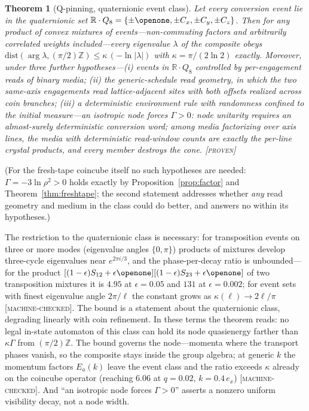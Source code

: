 \documentclass[aps,prd,twocolumn,superscriptaddress,nofootinbib,floatfix]{revtex4-2}
\newtheorem{theorem}{Theorem}
\newcommand{\evP}{\textnormal{\textsc{[proven]}}}
\newcommand{\evM}{\textnormal{\textsc{[machine-checked]}}}
\begin{document}
\begin{theorem}[Q-pinning, quaternionic event class]\label{thm:qbound}
Let every conversion event lie in the quaternionic set
$\mathbb R\cdot Q_8=\{\pm\openone,\pm C_x,\pm C_y,\pm C_z\}$. Then for
any product of convex mixtures of events---non-commuting factors and
arbitrarily correlated weights included---every eigenvalue $\lambda$ of
the composite obeys
$\mathrm{dist}(\arg\lambda,(\pi/2)\mathbb Z)\le\kappa\,(-\ln|\lambda|)$
with $\kappa=\pi/(2\ln2)$ exactly. Moreover, under three further
hypotheses---(i) events in $\mathbb R\cdot Q_8$ controlled by
per-engagement reads of binary media; (ii) the generic-schedule read
geometry, in which the two same-axis engagements read lattice-adjacent
sites with both offsets realized across coin branches; (iii) a
deterministic
environment rule with randomness confined to the initial measure---an
isotropic node forces $\Gamma>0$: node unitarity requires an
almost-surely deterministic conversion word; among media factorizing
over axis lines, the media with deterministic read-window counts are
exactly the per-line crystal products, and every member destroys the
cone. \evP{}
\end{theorem}

(For the fresh-tape coincube itself no such hypotheses are needed:
$\Gamma=-3\ln\rho^2>0$ holds exactly by Proposition~\ref{prop:factor}
and Theorem~\ref{thm:freshtape}; the second statement addresses whether
\emph{any} read geometry and medium in the class could do better, and
answers no within its hypotheses.)

The restriction to the quaternionic class is necessary: for
transposition events on three or more modes (eigenvalue angles
$\{0,\pi\}$) products of mixtures develop three-cycle eigenvalues near
$e^{2\pi i/3}$, and the phase-per-decay ratio is unbounded---for the
product $[(1-\epsilon)S_{12}+\epsilon\openone]
[(1-\epsilon)S_{23}+\epsilon\openone]$ of two transposition mixtures it
is $4.95$ at $\epsilon=0.05$ and $131$ at $\epsilon=0.002$; for event
sets with finest eigenvalue angle $2\pi/\ell$ the constant grows as
$\kappa(\ell)\to2\ell/\pi$ \evM{}. The bound is a statement about the
quaternionic class, degrading linearly with coin refinement. In these
terms the theorem reads: no legal in-state automaton of this class can
hold its node quasienergy farther than $\kappa\Gamma$ from
$(\pi/2)\mathbb Z$. The bound governs the node---momenta where the
transport phases vanish, so the composite stays inside the group
algebra; at generic $k$ the momentum factors $E_a(k)$ leave the event
class and the ratio exceeds $\kappa$ already on the coincube operator
(reaching $6.06$ at $q=0.02$, $k=0.4\,e_x$) \evM{}. And ``an isotropic
node forces $\Gamma>0$'' asserts a nonzero uniform visibility decay,
not a node width.
\end{document}

